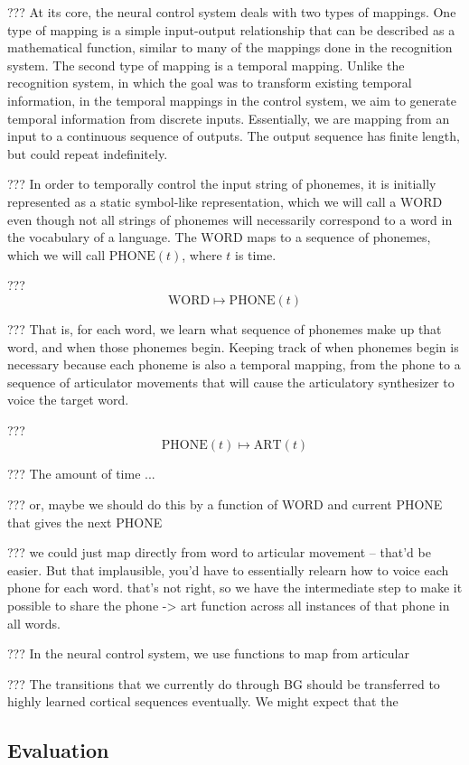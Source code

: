 ??? At its core, the neural control system
deals with two types of mappings.
One type of mapping is a simple
input-output relationship
that can be described as a mathematical function,
similar to many of the mappings
done in the recognition system.
The second type of mapping is a temporal mapping.
Unlike the recognition system,
in which the goal was to
transform existing temporal information,
in the temporal mappings in the control system,
we aim to generate temporal information
from discrete inputs.
Essentially, we are mapping from
an input to a continuous sequence of outputs.
The output sequence has finite length,
but could repeat indefinitely.

??? In order to temporally control
the input string of phonemes,
it is initially represented
as a static symbol-like representation,
which we will call a $\text{WORD}$
even though not all strings of phonemes
will necessarily correspond
to a word in the vocabulary of a language.
The $\text{WORD}$ maps to a
sequence of phonemes,
which we will call
$\text{PHONE}(t)$,
where $t$ is time.

??? $$\text{WORD} \mapsto \text{PHONE}(t)$$

??? That is, for each word, we learn
what sequence of phonemes make up that word,
and when those phonemes begin.
Keeping track of when phonemes begin
is necessary because
each phoneme is also a temporal mapping,
from the phone to
a sequence of articulator movements
that will cause the articulatory synthesizer
to voice the target word.

??? $$\text{PHONE}(t) \mapsto \text{ART}(t)$$

??? The amount of time ...

??? or, maybe we should do this by
a function of WORD and current PHONE
that gives the next PHONE

??? we could just map directly from word
to articular movement -- that'd be easier.
But that implausible, you'd have to
essentially relearn how to voice each phone
for each word. that's not right, so we
have the intermediate step to make it
possible to share the phone -> art
function across all instances of that phone
in all words.

??? In the neural control system,
we use functions to map from
articular


??? The transitions that we currently do through
BG should be transferred to highly learned
cortical sequences eventually.
We might expect that the

\subsection{Evaluation}

